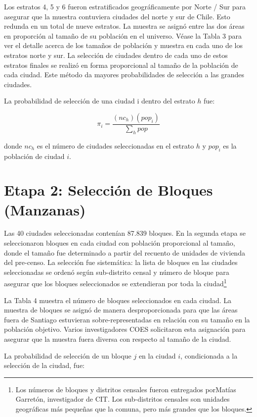 \documentclass[
]{book}
\begin{document}
Los estratos 4, 5 y 6 fueron estratificados geográficamente por Norte / Sur para asegurar que la muestra contuviera ciudades del norte y sur de Chile. Esto redunda en un total de nueve estratos. La muestra se asignó entre las dos áreas en proporción al tamaño de su población en el universo. Véase la Tabla 3 para ver el detalle acerca de los tamaños de población y muestra en cada uno de los estratos norte y sur.
La selección de ciudades dentro de cada uno de estos estratos finales se realizó en forma proporcional al tamaño de la población de cada ciudad. Este método da mayores probabilidades de selección a las grandes ciudades.

La probabilidad de selección de una ciudad i dentro del estrato \(h\) fue:

\[\pi_i=\frac{(nc_h)(pop_i)}{\sum_h pop}\]

donde \(nc_h\) es el número de ciudades seleccionadas en el estrato \(h\) y \(pop_i\) es la población de ciudad \(i\).

\hypertarget{etapa-2-selecciuxf3n-de-bloques-manzanas}{%
\section{Etapa 2: Selección de Bloques (Manzanas)}\label{etapa-2-selecciuxf3n-de-bloques-manzanas}}

Las 40 ciudades seleccionadas contenían 87.839 bloques. En la segunda etapa se seleccionaron bloques en cada ciudad con población proporcional al tamaño, donde el tamaño fue determinado a partir del recuento de unidades de vivienda del pre-censo. La selección fue sistemática: la lista de bloques en las ciudades seleccionadas se ordenó según sub-distrito censal y número de bloque para asegurar que los bloques seleccionados se extendieran por toda la
ciudad\footnote{Los números de bloques y distritos censales fueron entregados porMatías Garretón, investigador de CIT. Los sub-distritos censales son unidades geográficas más pequeñas que la comuna, pero más grandes que los bloques.}

La Tabla 4 muestra el número de bloques seleccionados en cada ciudad. La muestra de bloques se asignó de manera desproporcionada para que las áreas fuera de Santiago estuvieran sobre-representadas en relación con su tamaño en la población objetivo. Varios investigadores COES solicitaron esta asignación para asegurar que la muestra fuera diversa con respecto al tamaño de la ciudad.

La probabilidad de selección de un bloque \(j\) en la ciudad \(i\), condicionada a la selección de la ciudad, fue:
\end{document}
